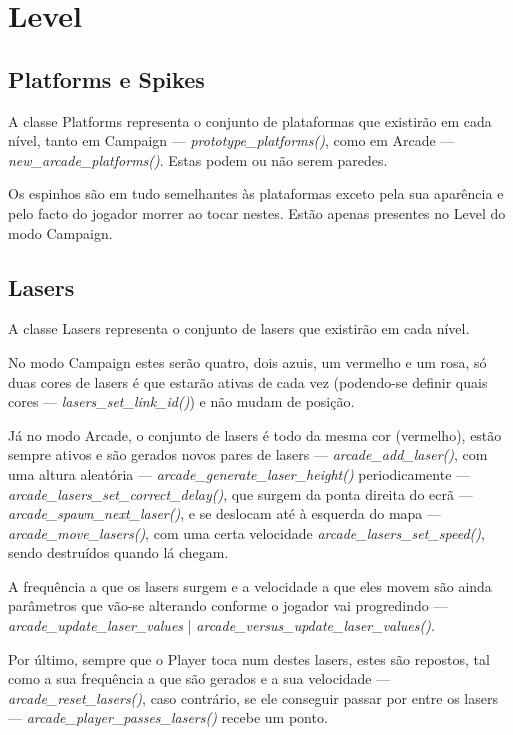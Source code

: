 \documentclass{report}
\begin{document}
\section{Level}

\subsection{Platforms e Spikes}

A classe Platforms representa o conjunto de plataformas que existirão em cada nível, tanto em Campaign --- \textit{prototype\_platforms()}, como em Arcade --- \textit{new\_arcade\_platforms()}. Estas podem ou não serem paredes.

Os espinhos são em tudo semelhantes às plataformas exceto pela sua aparência e pelo facto do jogador morrer ao tocar nestes. Estão apenas presentes no Level do modo Campaign.

\subsection{Lasers}

A classe Lasers representa o conjunto de lasers que existirão em cada nível. 

No modo Campaign estes serão quatro, dois azuis, um vermelho e um rosa, só duas cores de lasers é que estarão ativas de cada vez (podendo-se definir quais cores --- \textit{lasers\_set\_link\_id()}) e não mudam de posição.

Já no modo Arcade, o conjunto de lasers é todo da mesma cor (vermelho), estão sempre ativos e são gerados novos pares de lasers --- \textit{arcade\_add\_laser()}, com uma altura aleatória --- \textit{arcade\_generate\_laser\_height()} periodicamente --- \textit{arcade\_lasers\_set\_correct\_delay()}, que surgem da ponta direita do ecrã --- \textit{arcade\_spawn\_next\_laser()}, e se deslocam até à esquerda do mapa --- \textit{arcade\_move\_lasers()}, com uma certa velocidade \textit{arcade\_lasers\_set\_speed()}, sendo destruídos quando lá chegam.

A frequência a que os lasers surgem e a velocidade a que eles movem são ainda parâmetros que vão-se alterando conforme o jogador vai progredindo --- \textit{arcade\_update\_laser\_values} | \textit{arcade\_versus\_update\_laser\_values()}.

Por último, sempre que o Player toca num destes lasers, estes são repostos, tal como a sua frequência a que são gerados e a sua velocidade --- \textit{arcade\_reset\_lasers()}, caso contrário, se ele conseguir passar por entre os lasers --- \textit{arcade\_player\_passes\_lasers()} recebe um ponto.
\end{document}
